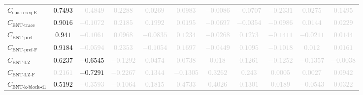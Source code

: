 \documentclass{standalone}
\newcommand{\enttracename}{\text{ENT-trace}}
\newcommand{\enttrace}{C_{\enttracename}}
\newcommand{\entprefixname}{\text{ENT-pref}}
\newcommand{\entprefix}{C_{\entprefixname}}
\newcommand{\entprefixflatname}{\text{ENT-pref-F}}
\newcommand{\entprefixflat}{C_{\entprefixflatname}}
\newcommand{\entlempelzivname}{\text{ENT-LZ}}
\newcommand{\entlempelziv}{C_{\entlempelzivname}}
\newcommand{\entlempelzivflatname}{\text{ENT-LZ-F}}
\newcommand{\entlempelzivflat}{C_{\entlempelzivflatname}}
\newcommand{\entkblockdonename}{\text{ENT-k-block-d1}}
\newcommand{\entkblockdone}{C_{\entkblockdonename}}
\newcommand{\epanormsequenceename}{\text{epa-n-seq-E}}
\newcommand{\epanormsequencee}{C_{\epanormsequenceename}}
\begin{document}
\begin{tabular}{lcccccccccc}
$\epanormsequencee$ & $0.7493$ & \textcolor{lightgray}{$-0.4849$} & \textcolor{lightgray}{$0.2288$} & \textcolor{lightgray}{$0.0269$} & \textcolor{lightgray}{$0.0983$} & \textcolor{lightgray}{$-0.0086$} & \textcolor{lightgray}{$-0.0707$} & \textcolor{lightgray}{$-0.2331$} & \textcolor{lightgray}{$0.0275$} & \textcolor{lightgray}{$0.1495$} \\ 
$\enttrace$ & $0.9016$ & \textcolor{lightgray}{$-0.1072$} & \textcolor{lightgray}{$0.2185$} & \textcolor{lightgray}{$0.1992$} & \textcolor{lightgray}{$0.0195$} & \textcolor{lightgray}{$-0.0697$} & \textcolor{lightgray}{$-0.0354$} & \textcolor{lightgray}{$-0.0986$} & \textcolor{lightgray}{$0.0144$} & \textcolor{lightgray}{$0.0229$} \\ 
$\entprefix$ & $0.941$ & \textcolor{lightgray}{$-0.1061$} & \textcolor{lightgray}{$0.0968$} & \textcolor{lightgray}{$-0.0835$} & \textcolor{lightgray}{$0.1234$} & \textcolor{lightgray}{$-0.0268$} & \textcolor{lightgray}{$0.1273$} & \textcolor{lightgray}{$-0.1411$} & \textcolor{lightgray}{$-0.0211$} & \textcolor{lightgray}{$0.0144$} \\ 
$\entprefixflat$ & $0.9184$ & \textcolor{lightgray}{$-0.0594$} & \textcolor{lightgray}{$0.2353$} & \textcolor{lightgray}{$-0.1054$} & \textcolor{lightgray}{$0.1697$} & \textcolor{lightgray}{$-0.0449$} & \textcolor{lightgray}{$0.1095$} & \textcolor{lightgray}{$-0.1018$} & \textcolor{lightgray}{$0.012$} & \textcolor{lightgray}{$0.0161$} \\ 
$\entlempelziv$ & $0.6237$ & $-0.6545$ & \textcolor{lightgray}{$-0.1292$} & \textcolor{lightgray}{$0.0474$} & \textcolor{lightgray}{$0.0738$} & \textcolor{lightgray}{$0.018$} & \textcolor{lightgray}{$0.1261$} & \textcolor{lightgray}{$-0.1252$} & \textcolor{lightgray}{$-0.1357$} & \textcolor{lightgray}{$-0.0038$} \\ 
$\entlempelzivflat$ & \textcolor{lightgray}{$0.2161$} & $-0.7291$ & \textcolor{lightgray}{$-0.2267$} & \textcolor{lightgray}{$0.1344$} & \textcolor{lightgray}{$-0.1305$} & \textcolor{lightgray}{$0.3262$} & \textcolor{lightgray}{$0.243$} & \textcolor{lightgray}{$0.0005$} & \textcolor{lightgray}{$0.0027$} & \textcolor{lightgray}{$0.0942$} \\ 
$\entkblockdone$ & $0.5192$ & \textcolor{lightgray}{$-0.3593$} & \textcolor{lightgray}{$-0.1064$} & \textcolor{lightgray}{$0.1815$} & \textcolor{lightgray}{$0.4733$} & \textcolor{lightgray}{$0.4026$} & \textcolor{lightgray}{$0.1301$} & \textcolor{lightgray}{$0.0189$} & \textcolor{lightgray}{$-0.0543$} & \textcolor{lightgray}{$0.0322$} \\ 

\end{tabular}
\end{document}
